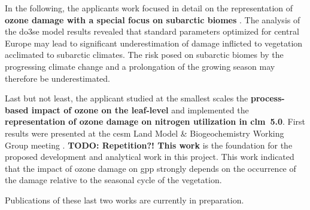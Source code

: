 In the following, the applicants work focused in detail on the representation of \textbf{ozone damage with a special focus on subarctic biomes} \parencites{ICPTF:Falk2021}{EGU:Falk2021}. The analysis of the \gls{do3se} model results revealed that standard parameters optimized for central Europe may lead to significant underestimation of damage inflicted to vegetation acclimated to subarctic climates. The risk posed on subarctic biomes by the progressing climate change and a prolongation of the growing season may therefore be underestimated.

Last but not least, the applicant studied at the smallest scales the \textbf{process-based impact of ozone on the leaf-level} and implemented the \textbf{representation of ozone damage on nitrogen utilization in \gls{clm}~5.0}. First results were presented at the \gls{cesm} Land Model \& Biogeochemistry Working Group meeting \parencite{CESMWP:Falk2021}. \textbf{\color{red}TODO: Repetition?! This work} is the foundation for the proposed development and analytical work in this project. This work indicated that the impact of ozone damage on \gls{gpp} strongly depends on the occurrence of the damage relative to the seasonal cycle of the vegetation.

Publications of these last two works are currently in preparation.
